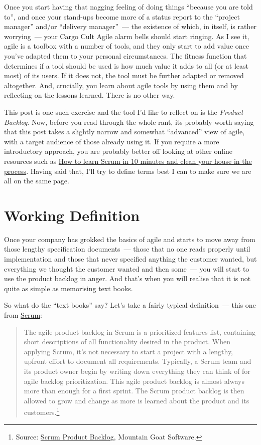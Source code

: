 \documentclass{book}
\begin{document}
Once you start having that nagging feeling of doing things ``because
you are told to'', and once your stand-ups become more of a status
report to the ``project manager'' and/or ``delivery manager''~--- the
existence of which, in itself, is rather worrying~--- your Cargo Cult
Agile alarm bells should start ringing. As I see it, agile is a
toolbox with a number of tools, and they only start to add value once
you've adapted them to your personal circumstances. The fitness
function that determines if a tool should be used is how much value it
adds to all (or at least most) of its users. If it does not, the tool
must be further adapted or removed altogether. And, crucially, you
learn about agile tools by using them and by reflecting on the lessons
learned. There is no other way.

This post is one such exercise and the tool I'd like to reflect on is
the \emph{Product Backlog}. Now, before you read through the whole
rant, its probably worth saying that this post takes a slightly narrow
and somewhat ``advanced'' view of agile, with a target audience of
those already using it. If you require a more introductory approach,
you are probably better off looking at other online resources such as
\href{http://zerodollarbill.blogspot.co.uk/2012/06/how-to-learn-scrum-in-10-minutes-and.html}{How
  to learn Scrum in 10 minutes and clean your house in the
  process}. Having said that, I'll try to define terms best I can to
make sure we are all on the same page.

\section{Working Definition}

Once your company has grokked the basics of agile and starts to move
away from those lengthy specification documents~--- those that no one
reads properly until implementation and those that never specified
anything the customer wanted, but everything we thought the customer
wanted and then some~--- you will start to use the product backlog in
anger. And that's when you will realise that it is not quite as simple
as memorising text books.

So what do the ``text books'' say? Let's take a fairly typical
definition~--- this one from
\href{https://en.wikipedia.org/wiki/Scrum_(software_development)}{Scrum}:

\begin{quote}
The agile product backlog in Scrum is a prioritized features list,
containing short descriptions of all functionality desired in the
product. When applying Scrum, it's not necessary to start a project
with a lengthy, upfront effort to document all
requirements. Typically, a Scrum team and its product owner begin by
writing down everything they can think of for agile backlog
prioritization. This agile product backlog is almost always more than
enough for a first sprint. The Scrum product backlog is then allowed
to grow and change as more is learned about the product and its
customers.\footnote{Source: \href{https://www.mountaingoatsoftware.com/agile/scrum/product-backlog}{Scrum Product Backlog}, Mountain Goat Software.}
\end{quote}
\end{document}
